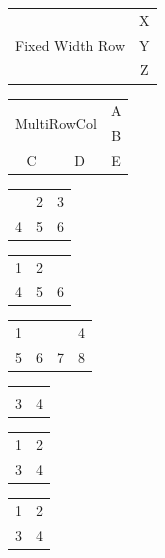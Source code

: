 \documentclass{article}
\begin{document}
\begin{tabular}{cc}
  \multirow{3}{2cm}{Fixed Width Row} & X \\
                                      & Y \\
                                      & Z \\
\end{tabular}

\begin{tabular}{ccc}
  \multicolumn{2}{c}{\multirow{2}{*}{MultiRowCol}} & A \\
  \multicolumn{2}{c}{}                             & B \\
  C & D & E \\
\end{tabular}

\begin{tabular}{ccc}
  & 2 & 3 \\
  4 & 5 & 6 \\
\end{tabular}

\begin{tabular}{ccc}
  1 & 2 & \\
  4 & 5 & 6 \\
\end{tabular}

\begin{tabular}{cccc}
  1 & & & 4 \\
  5 & 6 & 7 & 8 \\
\end{tabular}

\begin{tabular}{cc}
  & \\
  3 & 4 \\
\end{tabular}

\begin{tabular}{  c  c  }
    1   &    2    \\
    3   &    4    \\
\end{tabular}

\begin{tabular}{cc}
  1 & 2 \tabularnewline
  3 & 4 \tabularnewline
\end{tabular}
\end{document}
